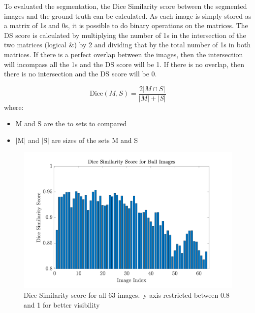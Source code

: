 \documentclass[conference]{IEEEtran}
\begin{document}


        To evaluated the segmentation, the Dice Similarity score between the segmented images and the ground truth can be calculated.
        As each image is simply stored as a matrix of 1s and 0s, it is possible to do binary operations on the matrices.
        The DS score is calculated by multiplying the number of 1s in the intersection of the two matrices (logical \&) by 2 and dividing 
        that by the total number of 1s in both matrices. If there is a perfect overlap between the images, then the intersection will 
        incompass all the 1s and the DS score will be 1. If there is no overlap, then there is no intersection and the DS score will be 0.

        \begin{equation}
            \text{Dice}(M, S) = \frac{2|M \cap S|}{|M| + |S|}
        \end{equation}
        where:
        \begin{itemize}
            \item M and S are the to sets to compared
            \item $|$M$|$ and $|$S$|$ are sizes of the sets M and S
        \end{itemize}
            

        \begin{figure}[htbp]
            \centering
            \includegraphics[width=\columnwidth]{figures/DS_bar_graph.pdf}
            \caption{Dice Similarity score for all 63 images.\ y-axis restricted between 0.8 and 1 for better visibility~\label{fig:DS_bar_graph}}
        \end{figure}
\end{document}
